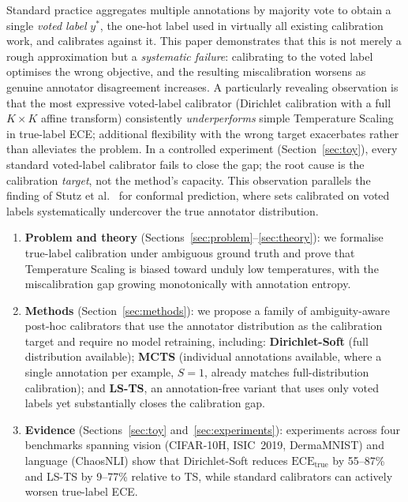 \documentclass[10pt,journal,compsoc]{IEEEtran}
\newcommand{\ECE}{\mathrm{ECE}}
\newcommand{\ECEtrue}{\ECE_{\text{true}}}
\begin{document}
Standard practice aggregates multiple annotations by majority vote to obtain a single \emph{voted label} $y^*$, the one-hot label used in virtually all existing calibration work, and calibrates against it.  This paper demonstrates that this is not merely a rough approximation but a \emph{systematic failure}: calibrating to the voted label optimises the wrong objective, and the resulting miscalibration worsens as genuine annotator disagreement increases.  A particularly revealing observation is that the most expressive voted-label calibrator (Dirichlet calibration with a full $K\!\times\!K$ affine transform) consistently \emph{underperforms} simple Temperature Scaling in true-label ECE; additional flexibility with the wrong target exacerbates rather than alleviates the problem.  In a controlled experiment (Section~\ref{sec:toy}), every standard voted-label calibrator fails to close the gap; the root cause is the calibration \emph{target}, not the method's capacity.  This observation parallels the finding of Stutz et al.~\cite{stutz2023conformal} for conformal prediction, where sets calibrated on voted labels systematically undercover the true annotator distribution.

\begin{enumerate}[leftmargin=*]
  \item \textbf{Problem and theory} (Sections~\ref{sec:problem}--\ref{sec:theory}): we formalise true-label calibration under ambiguous ground truth and prove that Temperature Scaling is biased toward unduly low temperatures, with the miscalibration gap growing monotonically with annotation entropy.
  \item \textbf{Methods} (Section~\ref{sec:methods}): we propose a family of ambiguity-aware post-hoc calibrators that use the annotator distribution as the calibration target and require no model retraining, including: \textbf{Dirichlet-Soft} (full distribution available); \textbf{MCTS} (individual annotations available, where a single annotation per example, $S{=}1$, already matches full-distribution calibration); and \textbf{LS-TS}, an annotation-free variant that uses only voted labels yet substantially closes the calibration gap.
  \item \textbf{Evidence} (Sections~\ref{sec:toy} and~\ref{sec:experiments}): experiments across four benchmarks spanning vision (CIFAR-10H, ISIC~2019, DermaMNIST) and language (ChaosNLI) show that Dirichlet-Soft reduces $\ECEtrue$ by 55--87\% and LS-TS by 9--77\% relative to TS, while standard calibrators can actively worsen true-label ECE.
\end{enumerate}
\end{document}
